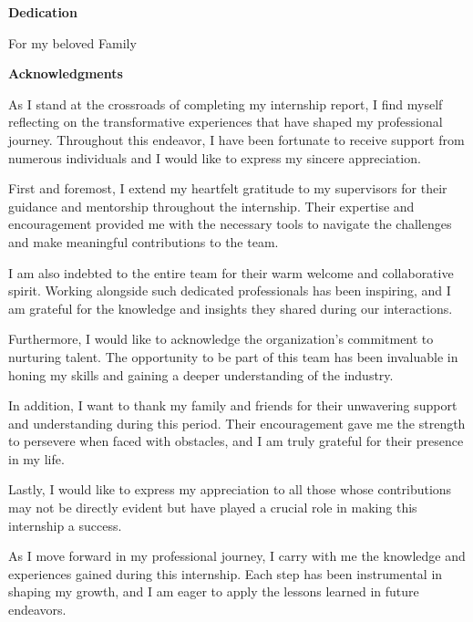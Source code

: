 \documentclass[a4paper,12pt,twoside]{report}
\begin{document}
\newpage

\begin{center}
    \Large{\textbf{Dedication}}
\end{center}


\begin{center}
    \Large{For my beloved Family}
\end{center}
\newpage
\thispagestyle{empty}
\begin{center}
    \Large\textbf{Acknowledgments}
\end{center}
As I stand at the crossroads of completing my internship report, I find myself reflecting on the transformative experiences that have shaped my professional journey. Throughout this endeavor, I have been fortunate to receive support from numerous individuals and I would like to express my sincere appreciation.

First and foremost, I extend my heartfelt gratitude to my supervisors for their guidance and mentorship throughout the internship. Their expertise and encouragement provided me with the necessary tools to navigate the challenges and make meaningful contributions to the team.

I am also indebted to the entire team for their warm welcome and collaborative spirit. Working alongside such dedicated professionals has been inspiring, and I am grateful for the knowledge and insights they shared during our interactions.

Furthermore, I would like to acknowledge the organization's commitment to nurturing talent. The opportunity to be part of this team has been invaluable in honing my skills and gaining a deeper understanding of the industry.

In addition, I want to thank my family and friends for their unwavering support and understanding during this period. Their encouragement gave me the strength to persevere when faced with obstacles, and I am truly grateful for their presence in my life.

Lastly, I would like to express my appreciation to all those whose contributions may not be directly evident but have played a crucial role in making this internship a success.

As I move forward in my professional journey, I carry with me the knowledge and experiences gained during this internship. Each step has been instrumental in shaping my growth, and I am eager to apply the lessons learned in future endeavors.
\end{document}
